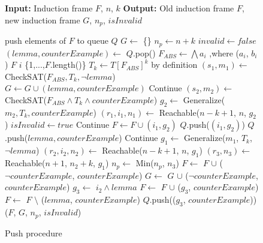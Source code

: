 \begin{figure}[H]
    \begin{mdframed}
        \begin{algorithmic}[1]
            \State \textbf{Input:} Induction frame $F$, $n$, $k$
            \State \textbf{Output:} Old induction frame $F$, new induction frame $G$, $n_p$, $isInvalid$

            \State push elements of $F$ to queue $Q$
            \State $G \gets$ \{\}
            \State $n_p \gets n + k$
            \State $invalid \gets false$
                \State $(lemma, counterExample)  \gets$ $Q$.pop()
                \State $F_{ABS} \gets \bigwedge a_i$ ,where ($a_i$, $b_i$) \in $F$ \forall $i$ \in \{1,...,$F$.length()\}
                \State $T_k \gets T[F_{ABS}]^k$ by definition
                \State $(s_1, m_1) \gets$ CheckSAT($F_{ABS}, T_k, \neg lemma$)
                    \State $G \gets G \cup (lemma, counterExample)$
                    \State Continue
                \EndIf
                \State $(s_2, m_2) \gets$ CheckSAT($F_{ABS} \wedge T_k \wedge counterExample$)
                    \State $ g_2 \gets $ Generalize($m_2, T_k, counterExample$)
                    \State $(r_1, i_1, n_1) \gets $ Reachable($n-k+1$, $n$, $g_2$)
                        \State $ isInvalid \gets true $
                        \State Continue
                    \Else
                        \State $F \gets F \cup (i_1, g_2)$
                        \State $Q$.push($(i_1, g_2)$)
                        \State $Q$.push($lemma, counterExample$)
                        \State Continue
                    \EndIf
                \EndIf
                \State $g_1 \gets$ Generalize($m_1$, $T_k$, $\neg lemma$)
                \State $(r_2, i_2, n_2) \gets $ Reachable($n-k+1$, $n$, $g_1$)
                    \State $(r_3, n_3) \gets $ Reachable($n+1$, $n_2 + k$, $g_1$)
                    \State $n_p \gets $ Min($n_p$, $n_3$)
                    \State $F \gets$ $F$ $\cup $ ($\neg counterExample$, $counterExample$)
                    \State $G \gets$ $G$ $\cup $ ($\neg counterExample$, $counterExample$)
                \Else
                    \State $g_3 \gets$ $i_2 \wedge lemma$
                    \State $F \gets$ $F$ $\cup $ ($g_3$, $counterExample$)
                    \State $F \gets$ $F$ $\setminus $ ($lemma$, $counterExample$)
                    \State $Q$.push(($g_3$, $counterExample$))
                \EndIf
                \State \Return ($F$, $G$, $n_p$, $isInvalid$)
            \EndWhile

        \end{algorithmic}
    \end{mdframed}
    \caption{Push procedure}\label{alg:3}
\end{figure}


